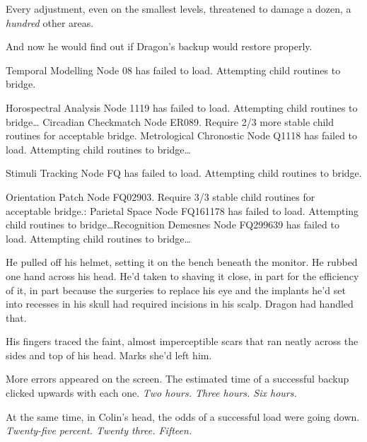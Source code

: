 Every adjustment, even on the smallest levels, threatened to damage a dozen, a \emph{hundred} other areas.



And now he would find out if Dragon's backup would restore properly.



 Temporal Modelling Node 08 has failed to load.  Attempting child routines to bridge.



 Horospectral Analysis Node 1119 has failed to load.  Attempting child routines to bridge\ldots{} Circadian Checkmatch Node ER089.  Require 2/3 more stable child routines for acceptable bridge. Metrological Chronostic Node Q1118 has failed to load.  Attempting child routines to bridge\ldots



 Stimuli Tracking Node FQ has failed to load.  Attempting child routines to bridge.



Orientation Patch Node FQ02903.  Require 3/3 stable child routines for acceptable bridge.: Parietal Space Node FQ161178 has failed to load.  Attempting child routines to bridge\ldots{}Recognition Demesnes Node FQ299639 has failed to load.  Attempting child routines to bridge\ldots



He pulled off his helmet, setting it on the bench beneath the monitor.  He rubbed one hand across his head.  He'd taken to shaving it close, in part for the efficiency of it, in part because the surgeries to replace his eye and the implants he'd set into recesses in his skull had required incisions in his scalp.  Dragon had handled that.



His fingers traced the faint, almost imperceptible scars that ran neatly across the sides and top of his head.  Marks she'd left him.



More errors appeared on the screen.  The estimated time of a successful backup clicked upwards with each one.  \emph{Two hours.  Three hours.  Six hours.}



At the same time, in Colin's head, the odds of a successful load were going down.  \emph{Twenty-five percent.  Twenty three.  Fifteen.}



